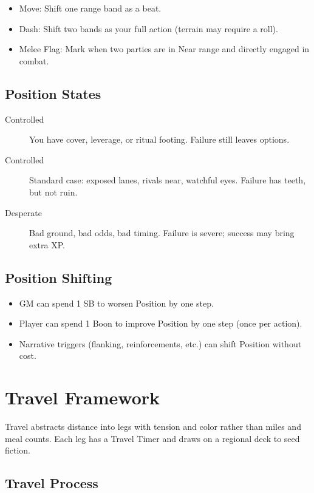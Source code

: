 \documentclass[11pt,twoside,openany]{book}
\begin{document}
\begin{itemize}
\item Move: Shift one range band as a beat.
\item Dash: Shift two bands as your full action (terrain may require a roll).
\item Melee Flag: Mark when two parties are in Near range and directly engaged in combat.
\end{itemize}

\subsection*{Position States}

\begin{description}
\item[Controlled] You have cover, leverage, or ritual footing. Failure still leaves options.
\item[Controlled] Standard case: exposed lanes, rivals near, watchful eyes. Failure has teeth, but not ruin.
\item[Desperate] Bad ground, bad odds, bad timing. Failure is severe; success may bring extra XP.
\end{description}

\subsection*{Position Shifting}

\begin{itemize}
\item GM can spend 1 SB to worsen Position by one step.
\item Player can spend 1 Boon to improve Position by one step (once per action).
\item Narrative triggers (flanking, reinforcements, etc.) can shift Position without cost.
\end{itemize}

\section*{Travel Framework} 

Travel abstracts distance into legs with tension and color rather than miles and meal counts. Each leg has a Travel Timer and draws on a regional deck to seed fiction.

\subsection*{Travel Process}
\end{document}
